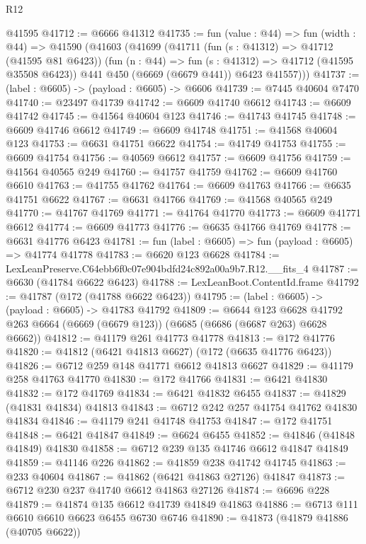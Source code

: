 \begin{lexlean}{R12}
\begin{coremodule}
    @41595
@41712 := @6666 @41312
@41735 := fun (value : @44) =>
  fun (width : @44) =>
  @41590
    (@41603
      (@41699
        (@41711
          (fun (s : @41312) => @41712 (@41595 @81 @6423))
          (fun (n : @44) => fun (s : @41312) => @41712 (@41595 @35508 @6423))
          @441
          @450
          (@6669 (@6679 @441))
          @6423
          @41557)))
@41737 := (label : @6605) -> (payload : @6605) -> @6606
@41739 := @7445 @40604 @7470
@41740 := @23497 @41739
@41742 := @6609 @41740 @6612
@41743 := @6609 @41742
@41745 := @41564 @40604 @123
@41746 := @41743 @41745
@41748 := @6609 @41746 @6612
@41749 := @6609 @41748
@41751 := @41568 @40604 @123
@41753 := @6631 @41751 @6622
@41754 := @41749 @41753
@41755 := @6609 @41754
@41756 := @40569 @6612
@41757 := @6609 @41756
@41759 := @41564 @40565 @249
@41760 := @41757 @41759
@41762 := @6609 @41760 @6610
@41763 := @41755 @41762
@41764 := @6609 @41763
@41766 := @6635 @41751 @6622
@41767 := @6631 @41766
@41769 := @41568 @40565 @249
@41770 := @41767 @41769
@41771 := @41764 @41770
@41773 := @6609 @41771 @6612
@41774 := @6609 @41773
@41776 := @6635 @41766 @41769
@41778 := @6631 @41776 @6423
@41781 := fun (label : @6605) => fun (payload : @6605) => @41774 @41778
@41783 := @6620 @123 @6628
@41784 := LexLeanPreserve.C64ebb6f0c07e904bdfd24c892a00a9b7.R12.__fits_4
@41787 := @6630 (@41784 @6622 @6423)
@41788 := LexLeanBoot.ContentId.frame
@41792 := @41787 (@172 (@41788 @6622 @6423))
@41795 := (label : @6605) -> (payload : @6605) -> @41783 @41792
@41809 := @6644
    @123
    @6628
    @41792
    @263
    @6664
    (@6669 (@6679 @123))
    (@6685 (@6686 (@6687 @263) @6628 @6662))
@41812 := @41179 @261 @41773 @41778
@41813 := @172 @41776
@41820 := @41812 (@6421 @41813 @6627) (@172 (@6635 @41776 @6423))
@41826 := @6712 @259 @148 @41771 @6612 @41813 @6627
@41829 := @41179 @258 @41763 @41770
@41830 := @172 @41766
@41831 := @6421 @41830
@41832 := @172 @41769
@41834 := @6421 @41832 @6455
@41837 := @41829 (@41831 @41834) @41813
@41843 := @6712 @242 @257 @41754 @41762 @41830 @41834
@41846 := @41179 @241 @41748 @41753
@41847 := @172 @41751
@41848 := @6421 @41847
@41849 := @6624 @6455
@41852 := @41846 (@41848 @41849) @41830
@41858 := @6712 @239 @135 @41746 @6612 @41847 @41849
@41859 := @41146 @226
@41862 := @41859 @238 @41742 @41745
@41863 := @233 @40604
@41867 := @41862 (@6421 @41863 @27126) @41847
@41873 := @6712 @230 @237 @41740 @6612 @41863 @27126
@41874 := @6696 @228
@41879 := @41874 @135 @6612 @41739 @41849 @41863
@41886 := @6713 @111 @6610 @6610 @6623 @6455 @6730 @6746
@41890 := @41873 (@41879 @41886 (@40705 @6622))

\end{coremodule}
\end{lexlean}
